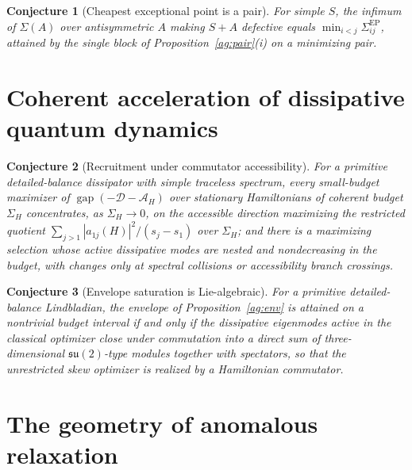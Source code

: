 \documentclass[11pt]{article}
\newtheorem{conjecture}{Conjecture}
\theoremstyle{definition}
\begin{document}
\begin{conjecture}[Cheapest exceptional point is a pair]\label{ag6}
For simple $S$, the infimum of $\Sigma(A)$ over antisymmetric $A$ making $S+A$ defective equals $\min_{i<j}\Sigma_{ij}^{\mathrm{EP}}$, attained by the single block of Proposition~\ref{ag:pair}(i) on a minimizing pair.
\end{conjecture}

\section{Coherent acceleration of dissipative quantum dynamics}

\begin{conjecture}[Recruitment under commutator accessibility]\label{ag7}
For a primitive detailed-balance dissipator with simple traceless spectrum, every small-budget maximizer of $\operatorname{gap}(-\mathcal D-\mathcal A_H)$ over stationary Hamiltonians of coherent budget $\Sigma_H$ concentrates, as $\Sigma_H\to0$, on the accessible direction maximizing the restricted quotient $\sum_{j>1}|a_{1j}(H)|^2/(s_j-s_1)$ over $\Sigma_H$; and there is a maximizing selection whose active dissipative modes are nested and nondecreasing in the budget, with changes only at spectral collisions or accessibility branch crossings.
\end{conjecture}

\begin{conjecture}[Envelope saturation is Lie-algebraic]\label{ag8}
For a primitive detailed-balance Lindbladian, the envelope of Proposition~\ref{ag:env} is attained on a nontrivial budget interval if and only if the dissipative eigenmodes active in the classical optimizer close under commutation into a direct sum of three-dimensional $\mathfrak{su}(2)$-type modules together with spectators, so that the unrestricted skew optimizer is realized by a Hamiltonian commutator.
\end{conjecture}

\section{The geometry of anomalous relaxation}
\end{document}
